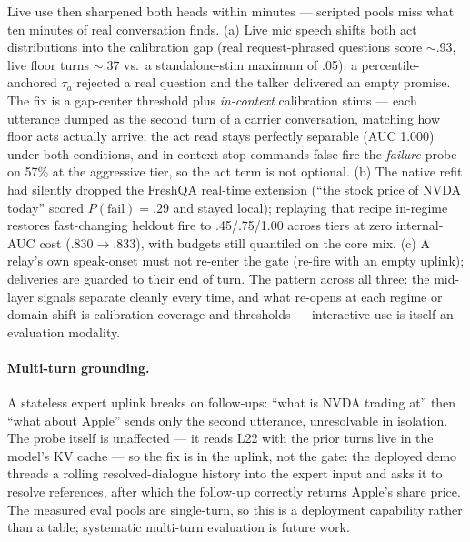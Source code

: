 Live use then sharpened both heads within minutes --- scripted pools
miss what ten minutes of real conversation finds. (a) Live mic speech
shifts both act distributions into the calibration gap (real
request-phrased questions score $\sim$.93, live floor turns $\sim$.37
vs.\ a standalone-stim maximum of .05): a percentile-anchored
$\tau_a$ rejected a real question and the talker delivered an empty
promise. The fix is a gap-center threshold plus \emph{in-context}
calibration stims --- each utterance dumped as the second turn of a
carrier conversation, matching how floor acts actually arrive; the
act read stays perfectly separable (AUC 1.000) under both conditions,
and in-context stop commands false-fire the \emph{failure} probe on
57\% at the aggressive tier, so the act term is not optional. (b) The
native refit had silently dropped the FreshQA real-time extension
(``the stock price of NVDA today'' scored $P(\mathrm{fail}){=}.29$
and stayed local); replaying that recipe in-regime restores
fast-changing heldout fire to .45/.75/1.00 across tiers at zero
internal-AUC cost (.830$\to$.833), with budgets still quantiled on
the core mix. (c) A relay's own speak-onset must not re-enter the
gate (re-fire with an empty uplink); deliveries are guarded to their
end of turn. The pattern across all three: the mid-layer signals
separate cleanly every time, and what re-opens at each regime or
domain shift is calibration coverage and thresholds --- interactive
use is itself an evaluation modality.

\paragraph{Multi-turn grounding.} A stateless expert uplink breaks on
follow-ups: ``what is NVDA trading at'' then ``what about Apple'' sends
only the second utterance, unresolvable in isolation. The probe itself
is unaffected --- it reads L22 with the prior turns live in the
model's KV cache --- so the fix is in the uplink, not the gate: the
deployed demo threads a rolling resolved-dialogue history into the
expert input and asks it to resolve references, after which the
follow-up correctly returns Apple's share price. The measured eval
pools are single-turn, so this is a deployment capability rather than
a table; systematic multi-turn evaluation is future work.

